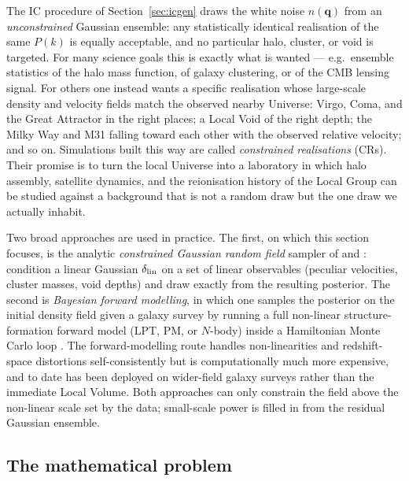 \documentclass[12pt]{article}
\newcommand{\bq}{\mathbf{q}}
\begin{document}
The IC procedure of Section~\ref{sec:icgen} draws the white noise
$n(\bq)$ from an \emph{unconstrained} Gaussian ensemble: any statistically
identical realisation of the same $P(k)$ is equally acceptable, and no
particular halo, cluster, or void is targeted.  For many science goals
this is exactly what is wanted --- e.g.\ ensemble statistics of the halo
mass function, of galaxy clustering, or of the CMB lensing signal.  For
others one instead wants a specific realisation whose large-scale
density and velocity fields match the observed nearby Universe:
Virgo, Coma, and the Great Attractor in the right places; a Local Void
of the right depth; the Milky Way and M31 falling toward each other with
the observed relative velocity; and so on.  Simulations built this way
are called \emph{constrained realisations} (CRs).  Their promise is to
turn the local Universe into a laboratory in which halo assembly,
satellite dynamics, and the reionisation history of the Local Group can
be studied against a background that is not a random draw but the
one draw we actually inhabit.

Two broad approaches are used in practice.  The first, on which this
section focuses, is the analytic \emph{constrained Gaussian random
field} sampler of \citet{Bertschinger1987} and \citet{HoffmanRibak1991}:
condition a linear Gaussian $\delta_{\rm lin}$ on a set of linear
observables (peculiar velocities, cluster masses, void depths) and
draw exactly from the resulting posterior.  The second is
\emph{Bayesian forward modelling}, in which one samples the posterior
on the initial density field given a galaxy survey by running a full
non-linear structure-formation forward model (LPT, PM, or $N$-body)
inside a Hamiltonian Monte Carlo loop
\citep{JascheWandelt2013,Wang2014}.  The forward-modelling route
handles non-linearities and redshift-space distortions self-consistently
but is computationally much more expensive, and to date has been
deployed on wider-field galaxy surveys rather than the immediate Local
Volume.  Both approaches can only constrain the field above the
non-linear scale set by the data; small-scale power is filled in from
the residual Gaussian ensemble.

\subsection{The mathematical problem}
\label{sec:cr_problem}
\end{document}
